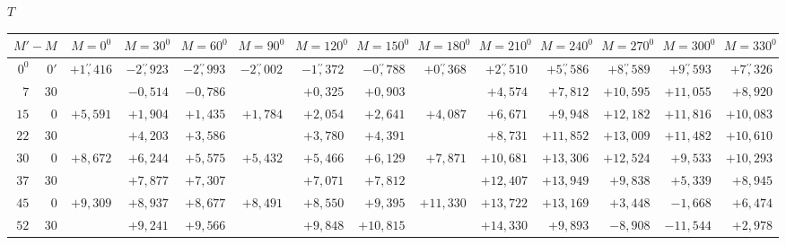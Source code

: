 \clearpage
\begin{landscape}
\begingroup
\fontsize{8.5}{10.5}\selectfont
{}
\renewcommand{\headrulewidth}{0pt}
\begin{center}\(T\)\end{center}
\setlength{\tabcolsep}{2.5pt}
\renewcommand{\arraystretch}{1.08}
\begin{longtable}{@{}rr|r|r|r|r|r|r|r|r|r|r|r|r@{}}
\hline
\multicolumn{2}{c|}{\(M'-M\)} & \(M=0^0\) & \(M=30^0\) & \(M=60^0\) & \(M=90^0\) & \(M=120^0\) & \(M=150^0\) & \(M=180^0\) & \(M=210^0\) & \(M=240^0\) & \(M=270^0\) & \(M=300^0\) & \(M=330^0\)\\
\hline
\endhead
\(0^0\) & \(0'\) & \(+1\overset{\prime\prime}{,}416\) & \(-2\overset{\prime\prime}{,}923\) & \(-2\overset{\prime\prime}{,}993\) & \(-2\overset{\prime\prime}{,}002\) & \(-1\overset{\prime\prime}{,}372\) & \(-0\overset{\prime\prime}{,}788\) & \(+0\overset{\prime\prime}{,}368\) & \(+2\overset{\prime\prime}{,}510\) & \(+5\overset{\prime\prime}{,}586\) & \(+8\overset{\prime\prime}{,}589\) & \(+9\overset{\prime\prime}{,}593\) & \(+7\overset{\prime\prime}{,}326\)\\
\(7\) & \(30\) &  & \(-0{,}514\) & \(-0{,}786\) &  & \(+0{,}325\) & \(+0{,}903\) &  & \(+4{,}574\) & \(+7{,}812\) & \(+10{,}595\) & \(+11{,}055\) & \(+8{,}920\)\\
\(15\) & \(0\) & \(+5{,}591\) & \(+1{,}904\) & \(+1{,}435\) & \(+1{,}784\) & \(+2{,}054\) & \(+2{,}641\) & \(+4{,}087\) & \(+6{,}671\) & \(+9{,}948\) & \(+12{,}182\) & \(+11{,}816\) & \(+10{,}083\)\\
\(22\) & \(30\) &  & \(+4{,}203\) & \(+3{,}586\) &  & \(+3{,}780\) & \(+4{,}391\) &  & \(+8{,}731\) & \(+11{,}852\) & \(+13{,}009\) & \(+11{,}482\) & \(+10{,}610\)\\[2pt]
\(30\) & \(0\) & \(+8{,}672\) & \(+6{,}244\) & \(+5{,}575\) & \(+5{,}432\) & \(+5{,}466\) & \(+6{,}129\) & \(+7{,}871\) & \(+10{,}681\) & \(+13{,}306\) & \(+12{,}524\) & \(+9{,}533\) & \(+10{,}293\)\\
\(37\) & \(30\) &  & \(+7{,}877\) & \(+7{,}307\) &  & \(+7{,}071\) & \(+7{,}812\) &  & \(+12{,}407\) & \(+13{,}949\) & \(+9{,}838\) & \(+5{,}339\) & \(+8{,}945\)\\
\(45\) & \(0\) & \(+9{,}309\) & \(+8{,}937\) & \(+8{,}677\) & \(+8{,}491\) & \(+8{,}550\) & \(+9{,}395\) & \(+11{,}330\) & \(+13{,}722\) & \(+13{,}169\) & \(+3{,}448\) & \(-1{,}668\) & \(+6{,}474\)\\
\(52\) & \(30\) &  & \(+9{,}241\) & \(+9{,}566\) &  & \(+9{,}848\) & \(+10{,}815\) &  & \(+14{,}330\) & \(+9{,}893\) & \(-8{,}908\) & \(-11{,}544\) & \(+2{,}978\)\\[2pt]

\end{longtable}
\end{landscape}
